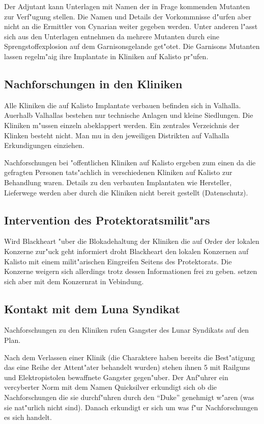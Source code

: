 Der Adjutant kann Unterlagen mit Namen der in Frage kommenden Mutanten zur Verf"ugung stellen. Die Namen und Details der Vorkommnisse d"urfen aber nicht an die Ermittler von Cynarian weiter gegeben werden. Unter anderen l"asst sich aus den Unterlagen entnehmen da\3 mehrere Mutanten durch eine Sprengstoffexplosion auf dem Garnisonsgelande get"otet. Die Garnisons Mutanten lassen regelm"a\3ig ihre Implantate in Kliniken auf Kalisto pr"ufen.

\subsection{Nachforschungen in den Kliniken}

Alle Kliniken die auf Kalisto Implantate verbauen befinden sich in Valhalla. Au\3erhalb Valhallas bestehen nur technische Anlagen und kleine Siedlungen. Die Kliniken  m"ussen einzeln abeklappert werden. Ein zentrales Verzeichnis der Klinken besteht nicht. Man mu\3 in den jeweiligen Distrikten auf Valhalla Erkundigungen einziehen.

Nachforschungen bei "offentlichen Kliniken auf Kalisto ergeben zum einen da\3 die gefragten Personen tats"achlich in
verschiedenen Kliniken auf Kalisto zur Behandlung waren. Details zu den verbauten Implantaten wie Hersteller, Lieferwege werden aber durch die Kliniken nicht bereit gestellt (Datenschutz).

\subsection{Intervention des Protektoratsmilit"ars}

Wird Blackheart "uber die Blokadehaltung der Kliniken die auf Order der lokalen Konzerne zur"uck geht informiert
droht Blackheart den lokalen Konzernen auf Kalisto mit einem milit"arischen Eingreifen Seitens des Protektorats. Die Konzerne weigern sich allerdings trotz dessen Informationen frei zu geben. setzen sich aber mit dem Konzernrat in Vebindung.

\subsection{Kontakt mit dem Luna Syndikat}

Nachforschungen zu den Kliniken rufen Gangster des Lunar Syndikats auf den Plan.

Nach dem Verlassen einer Klinik (die Charaktere haben bereits die Best"atigung das eine Reihe der Attent"ater behandelt wurden) stehen ihnen 5 mit Railguns und Elektropistolen bewaffnete Gangster gegen"uber. Der Anf"uhrer ein vercyberter Norm mit dem Namen Quicksilver erkundigt sich ob die Nachforschungen die sie durchf"uhren durch den ``Duke'' genehmigt w"aren (was sie nat"urlich nicht sind). Danach erkundigt er sich um was f"ur Nachforschungen es sich handelt.

